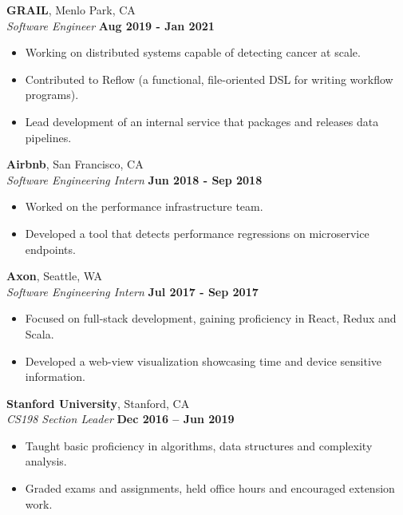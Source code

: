 \documentclass[margin,line]{resume}
\begin{document}
\begin{resume}
    \textbf{GRAIL}, Menlo Park, CA \vspace{1mm} \\\vspace{1mm}%
    \textsl{Software Engineer} \hfill \textbf{Aug 2019 - Jan 2021}
    \begin{itemize}
        \item Working on distributed systems capable of detecting cancer at scale.
	\item Contributed to Reflow (a functional, file-oriented DSL for writing workflow programs).
	\item Lead development of an internal service that packages and releases data pipelines.
    \end{itemize}

    \textbf{Airbnb}, San Francisco, CA \vspace{1mm}\\\vspace{1mm}%
    \textsl{Software Engineering Intern} \hfill \textbf{Jun 2018 - Sep 2018}
    \begin{itemize}
        \item Worked on the performance infrastructure team.
        \item Developed a tool that detects performance regressions on microservice endpoints.
    \end{itemize}

    \textbf{Axon}, Seattle, WA \vspace{1mm}\\\vspace{1mm}%
    \textsl{Software Engineering Intern} \hfill \textbf{Jul 2017 - Sep 2017}
    \begin{itemize}
        \item Focused on full-stack development, gaining proficiency in React, Redux and Scala.
	\item Developed a web-view visualization showcasing time and device sensitive information.
    \end{itemize}

    \textbf{Stanford University}, Stanford, CA \vspace{1mm}\\\vspace{1mm}%
    \textsl{CS198 Section Leader} \hfill \textbf{Dec 2016 -- Jun 2019}
    \begin{itemize}
        \item Taught basic proficiency in algorithms, data structures and complexity analysis.
	\item Graded exams and assignments, held office hours and encouraged extension work.
    \end{itemize}


\end{resume}
\end{document}
